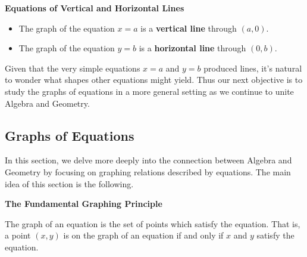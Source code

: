 \medskip

\colorbox{ResultColor}{\bbm


\centerline{\textbf{Equations of Vertical and Horizontal Lines}}

\begin{itemize}

\item The graph of the equation $x=a$ is a \textbf{vertical line} through $(a,0)$. 

\item The graph of the equation $y=b$ is a \textbf{horizontal line} through $(0,b)$. 

\end{itemize}

\ebm}

\medskip

Given that the very simple equations $x = a$ and $y = b$ produced lines, it's natural to wonder what shapes other equations might yield.  Thus our next objective is to study the graphs of equations in a more general setting as we continue to unite Algebra and Geometry.

\subsection{Graphs of Equations}

\label{GraphsofEquations}

In this section, we delve more deeply into the connection between Algebra and Geometry by focusing on graphing relations described by equations.  The main idea of this section is the following.

\medskip

\colorbox{ResultColor}{\bbm


\centerline{\textbf{The Fundamental Graphing Principle}}

\label{fgp}    

The graph of an equation is the set of points which satisfy the equation.  That is, a point $(x,y)$ is on the graph of an equation if and only if $x$ and $y$ satisfy the equation.


\ebm}

